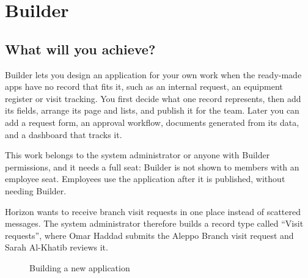 \chapter{Builder}
\label{ch:builder}

\section{What will you achieve?}

Builder lets you design an application for your own work when the ready-made apps have no record that fits it, such as an internal request, an equipment register or visit tracking. You first decide what one record represents, then add its fields, arrange its page and lists, and publish it for the team. Later you can add a request form, an approval workflow, documents generated from its data, and a dashboard that tracks it.

This work belongs to the system administrator or anyone with Builder permissions, and it needs a full seat: Builder is not shown to members with an employee seat. Employees use the application after it is published, without needing Builder.

\begin{rcnote}
Horizon wants to receive branch visit requests in one place instead of scattered messages. The system administrator therefore builds a record type called “Visit requests”, where Omar Haddad submits the Aleppo Branch visit request and Sarah Al-Khatib reviews it.
\end{rcnote}

\begin{figure}[H]
\centering
{}
\rclegend
\caption{Building a new application}
\label{fig:builder-overview-flow}
\end{figure}

